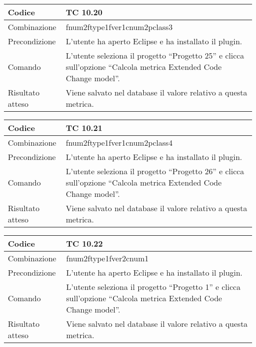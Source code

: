 \begin{table}[ht]
\begin{tabular}{|p{3cm}|p{9cm}|}
\hline
\cellcolor{lightgray}Codice				& TC 10.20								\\
\hline
\cellcolor{lightgray}Combinazione		& fnum2ftype1fver1cnum2pclass3									\\
\hline
\cellcolor{lightgray}Precondizione		& L'utente ha aperto Eclipse e ha installato il plugin.		\\
\hline
\cellcolor{lightgray}Comando			& L'utente seleziona il progetto ``Progetto 25''  e clicca sull'opzione ``Calcola metrica Extended Code Change model''.	\\
\hline
\cellcolor{lightgray}Risultato atteso	& Viene salvato nel database il valore relativo a questa metrica.\\
\hline
\end{tabular}
\end{table}

\begin{table}[ht]
\begin{tabular}{|p{3cm}|p{9cm}|}
\hline
\cellcolor{lightgray}Codice				& TC 10.21								\\
\hline
\cellcolor{lightgray}Combinazione		& fnum2ftype1fver1cnum2pclass4									\\
\hline
\cellcolor{lightgray}Precondizione		& L'utente ha aperto Eclipse e ha installato il plugin.		\\
\hline
\cellcolor{lightgray}Comando			& L'utente seleziona il progetto ``Progetto 26''  e clicca sull'opzione ``Calcola metrica Extended Code Change model''.	\\
\hline
\cellcolor{lightgray}Risultato atteso	& Viene salvato nel database il valore relativo a questa metrica.\\
\hline
\end{tabular}
\end{table}

\clearpage

\begin{table}[ht]
\begin{tabular}{|p{3cm}|p{9cm}|}
\hline
\cellcolor{lightgray}Codice				& TC 10.22								\\
\hline
\cellcolor{lightgray}Combinazione		& fnum2ftype1fver2cnum1									\\
\hline
\cellcolor{lightgray}Precondizione		& L'utente ha aperto Eclipse e ha installato il plugin.		\\
\hline
\cellcolor{lightgray}Comando			& L'utente seleziona il progetto ``Progetto 1''  e clicca sull'opzione ``Calcola metrica Extended Code Change model''.	\\
\hline
\cellcolor{lightgray}Risultato atteso	& Viene salvato nel database il valore relativo a questa metrica.\\
\hline
\end{tabular}
\end{table}


